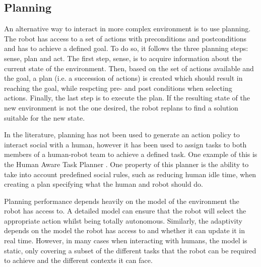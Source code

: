 \subsection{Planning} \label{ssec:planning}
    
    An alternative way to interact in more complex environment is to use planning. The robot has access to a set of actions with preconditions and postconditions and has to achieve a defined goal. To do so, it follows the three planning steps: sense, plan and act. The first step, sense, is to acquire information about the current state of the environment. Then, based on the set of actions available and the goal, a plan (i.e. a succession of actions) is created which should result in reaching the goal, while respcting pre- and post conditions when selecting actions. Finally, the last step is to execute the plan. If the resulting state of the new environment is not the one desired, the robot replans to find a solution suitable for the new state.
    
    
    In the literature, planning has not been used to generate an action policy to interact social with a human, however it has been used to assign tasks to both members of a human-robot team to achieve a defined task. One example of this is the Human Aware Task Planner \citep{alili2009task}. One property of this planner is the ability to take into account predefined social rules, such as reducing human idle time, when creating a plan specifying what the human and robot should do.
    
    Planning performance depends heavily on the model of the environment the robot has access to. A detailed model can ensure that the robot will select the appropriate action whilst being totally autonomous. Similarly, the adaptivity depends on the model the robot has access to and whether it can update it in real time. However, in many cases when interacting with humans, the model is static, only covering a subset of the different tasks that the robot can be required to achieve and the different contexts it can face.
    
    
